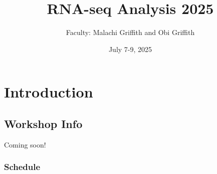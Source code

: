 \documentclass[
]{book}
\title{RNA-seq Analysis 2025}
\author{Faculty: Malachi Griffith and Obi Griffith}
\date{July 7-9, 2025}
\begin{document}
\maketitle

{
\setcounter{tocdepth}{1}
\tableofcontents
}
\part{Introduction}\label{part-introduction}

\chapter{Workshop Info}\label{workshop-info}

Coming soon!

\section{Schedule}\label{schedule}
\end{document}

